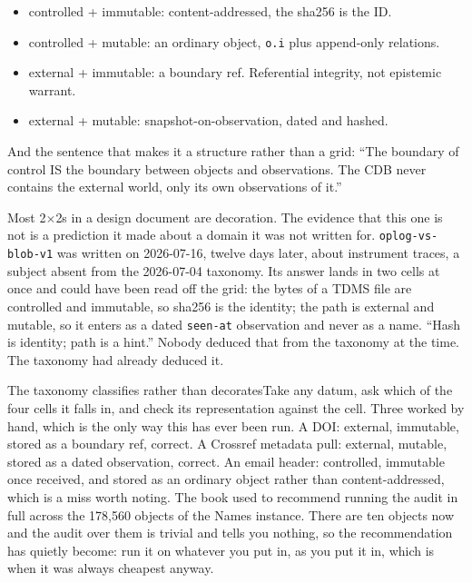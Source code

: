 \begin{itemize}
\item controlled + immutable: content-addressed, the sha256 is the ID.
\item controlled + mutable: an ordinary object, \texttt{o.i} plus append-only relations.
\item external + immutable: a boundary ref. Referential integrity, not epistemic warrant.
\item external + mutable: snapshot-on-observation, dated and hashed.
\end{itemize}

And the sentence that makes it a structure rather than a grid: ``The boundary of control IS the boundary between objects and observations. The CDB never contains the external world, only its own observations of it.''

Most 2$\times$2s in a design document are decoration. The evidence that this one is not is a prediction it made about a domain it was not written for. \texttt{oplog-vs-blob-v1} was written on 2026-07-16, twelve days later, about instrument traces, a subject absent from the 2026-07-04 taxonomy. Its answer lands in two cells at once and could have been read off the grid: the bytes of a TDMS file are controlled and immutable, so sha256 is the identity; the path is external and mutable, so it enters as a dated \texttt{seen-at} observation and never as a name. ``Hash is identity; path is a hint.'' Nobody deduced that from the taxonomy at the time. The taxonomy had already deduced it.

\begin{Correspondence}{The taxonomy classifies rather than decorates}{Take any datum, ask which of the four cells it falls in, and check its representation against the cell.}
Three worked by hand, which is the only way this has ever been run. A DOI: external, immutable, stored as a boundary ref, correct. A Crossref metadata pull: external, mutable, stored as a dated observation, correct. An email header: controlled, immutable once received, and stored as an ordinary object rather than content-addressed, which is a miss worth noting. The book used to recommend running the audit in full across the 178,560 objects of the Names instance. There are ten objects now and the audit over them is trivial and tells you nothing, so the recommendation has quietly become: run it on whatever you put in, as you put it in, which is when it was always cheapest anyway.
\end{Correspondence}

